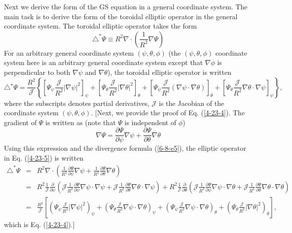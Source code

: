\documentclass{article}
\begin{document}
Next we derive the form of the GS equation in a general coordinate system. The
main task is to derive the form of the toroidal elliptic operator in the
general coordinate system. The toroidal elliptic operator takes the form
\begin{equation}
  \label{4-23-5} \triangle^{\ast} \Psi \equiv R^2 \nabla \cdot \left(
  \frac{1}{R^2} \nabla \Psi \right)
\end{equation}
For an arbitrary general coordinate system $(\psi, \theta, \phi)$ (the $(\psi,
\theta, \phi)$ coordinate system here is an arbitrary general coordinate
system except that $\nabla \phi$ is perpendicular to both $\nabla \psi$ and
$\nabla \theta$), the toroidal elliptic operator is written
\begin{equation}
  \label{4-23-4} \triangle^{\star} \Psi = \frac{R^2}{\mathcal{J}} \left\{
  \left[ \Psi_{\psi} \frac{\mathcal{J}}{R^2} | \nabla \psi |^2 \right]_{\psi}
  + \left[ \Psi_{\theta} \frac{\mathcal{J}}{R^2} | \nabla \theta |^2
  \right]_{\theta} + \left[ \Psi_{\psi} \frac{\mathcal{J}}{R^2} (\nabla \psi
  \cdot \nabla \theta) \right]_{\theta} + \left[ \Psi_{\theta}
  \frac{\mathcal{J}}{R^2} \nabla \theta \cdot \nabla \psi \right]_{\psi}
  \right\},
\end{equation}
where the subscripts denotes partial derivatives, $\mathcal{J}$ is the
Jacobian of the coordinate system $(\psi, \theta, \phi)$. [Next, we provide
the proof of Eq. (\ref{4-23-4}). The gradient of $\Psi$ is written as (note
that $\Psi$ is independent of $\phi$)
\begin{equation}
  \label{4-23-1} \nabla \Psi = \frac{\partial \Psi}{\partial \psi} \nabla \psi
  + \frac{\partial \Psi}{\partial \theta} \nabla \theta
\end{equation}
Using this expression and the divergence formula (\ref{6-8-e5}), the elliptic
operator in Eq. (\ref{4-23-5}) is written
\begin{eqnarray}
  \triangle^{\ast} \Psi & = & R^2 \nabla \cdot \left( \frac{1}{R^2}
  \frac{\partial \Psi}{\partial \psi} \nabla \psi + \frac{1}{R^2}
  \frac{\partial \Psi}{\partial \theta} \nabla \theta \right) \nonumber\\
  & = & R^2 \frac{1}{\mathcal{J}} \frac{\partial}{\partial \psi} \left(
  \mathcal{J} \frac{1}{R^2} \frac{\partial \Psi}{\partial \psi} \nabla \psi
  \cdot \nabla \psi + \mathcal{J} \frac{1}{R^2} \frac{\partial \Psi}{\partial
  \theta} \nabla \theta \cdot \nabla \psi \right) + R^2 \frac{1}{\mathcal{J}}
  \frac{\partial}{\partial \theta} \left( \mathcal{J} \frac{1}{R^2}
  \frac{\partial \Psi}{\partial \psi} \nabla \psi \cdot \nabla \theta +
  \mathcal{J} \frac{1}{R^2} \frac{\partial \Psi}{\partial \theta} \nabla
  \theta \cdot \nabla \theta \right) \nonumber\\
  & = & \frac{R^2}{\mathcal{J}} \left[ \left( \Psi_{\psi}
  \frac{\mathcal{J}}{R^2} | \nabla \psi |^2 \right)_{\psi} + \left(
  \Psi_{\theta} \frac{\mathcal{J}}{R^2} \nabla \psi \cdot \nabla \theta
  \right)_{\psi} + \left( \Psi_{\psi} \frac{\mathcal{J}}{R^2} \nabla \psi
  \cdot \nabla \theta \right)_{\theta} + \left( \Psi_{\theta}
  \frac{\mathcal{J}}{R^2} | \nabla \theta |^2 \right)_{\theta} \right], 
\end{eqnarray}
which is Eq. (\ref{4-23-4}).]
\end{document}
